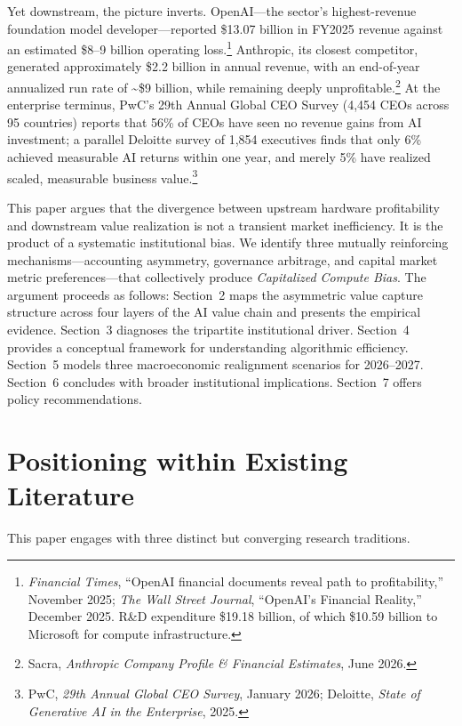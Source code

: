\documentclass[11pt,letterpaper]{article}
\begin{document}
Yet downstream, the picture inverts. OpenAI---the sector's highest-revenue foundation model developer---reported \$13.07 billion in FY2025 revenue against an estimated \$8--9 billion operating loss.\footnote{\textit{Financial Times}, ``OpenAI financial documents reveal path to profitability,'' November 2025; \textit{The Wall Street Journal}, ``OpenAI's Financial Reality,'' December 2025. R\&D expenditure \$19.18 billion, of which \$10.59 billion to Microsoft for compute infrastructure.} Anthropic, its closest competitor, generated approximately \$2.2 billion in annual revenue, with an end-of-year annualized run rate of \textasciitilde\$9 billion, while remaining deeply unprofitable.\footnote{Sacra, \textit{Anthropic Company Profile \& Financial Estimates}, June 2026.} At the enterprise terminus, PwC's 29th Annual Global CEO Survey (4,454 CEOs across 95 countries) reports that 56\% of CEOs have seen no revenue gains from AI investment; a parallel Deloitte survey of 1,854 executives finds that only 6\% achieved measurable AI returns within one year, and merely 5\% have realized scaled, measurable business value.\footnote{PwC, \textit{29th Annual Global CEO Survey}, January 2026; Deloitte, \textit{State of Generative AI in the Enterprise}, 2025.}

This paper argues that the divergence between upstream hardware profitability and downstream value realization is not a transient market inefficiency. It is the product of a systematic institutional bias. We identify three mutually reinforcing mechanisms---accounting asymmetry, governance arbitrage, and capital market metric preferences---that collectively produce \textit{Capitalized Compute Bias}. The argument proceeds as follows: Section~2 maps the asymmetric value capture structure across four layers of the AI value chain and presents the empirical evidence. Section~3 diagnoses the tripartite institutional driver. Section~4 provides a conceptual framework for understanding algorithmic efficiency. Section~5 models three macroeconomic realignment scenarios for 2026--2027. Section~6 concludes with broader institutional implications. Section~7 offers policy recommendations.

\section{Positioning within Existing Literature}

This paper engages with three distinct but converging research traditions.
\end{document}
